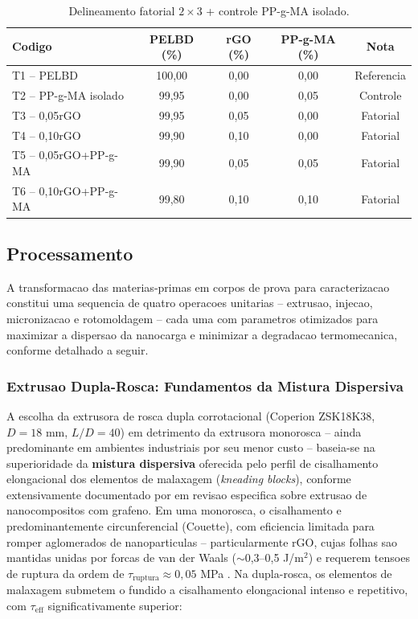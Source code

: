 \documentclass[11pt,a4paper,oneside]{article}
\begin{document}
\begin{table}[H]\centering
\caption{Delineamento fatorial $2{\times}3$ + controle PP-g-MA isolado.}\label{tab:del}
\begin{tabular}{lcccc}
\toprule
{\bfseries Codigo} & {\bfseries PELBD (\%)} & {\bfseries rGO (\%)} & {\bfseries PP-g-MA (\%)} & {\bfseries Nota} \\
\midrule
T1 -- PELBD           & 100,00 & 0,00 & 0,00 & Referencia \\
T2 -- PP-g-MA isolado & 99,95  & 0,00 & 0,05 & Controle \\
T3 -- 0,05rGO         & 99,95  & 0,05 & 0,00 & Fatorial \\
T4 -- 0,10rGO         & 99,90  & 0,10 & 0,00 & Fatorial \\
T5 -- 0,05rGO+PP-g-MA & 99,90  & 0,05 & 0,05 & Fatorial \\
T6 -- 0,10rGO+PP-g-MA & 99,80  & 0,10 & 0,10 & Fatorial \\
\bottomrule
\end{tabular}
\end{table}

\subsection{Processamento}\label{sec:processamento}

A transformacao das materias-primas em corpos de prova para caracterizacao constitui uma
sequencia de quatro operacoes unitarias -- extrusao, injecao, micronizacao e rotomoldagem --
cada uma com parametros otimizados para maximizar a dispersao da nanocarga e minimizar a
degradacao termomecanica, conforme detalhado a seguir.

\subsubsection{Extrusao Dupla-Rosca: Fundamentos da Mistura Dispersiva}

A escolha da extrusora de rosca dupla corrotacional (Coperion ZSK18K38, $D{=}18$ mm,
$L/D{=}40$) em detrimento da extrusora monorosca -- ainda predominante em ambientes industriais
por seu menor custo -- baseia-se na superioridade da {\bfseries mistura dispersiva} oferecida
pelo perfil de cisalhamento elongacional dos elementos de malaxagem (\textit{kneading blocks}),
conforme extensivamente documentado por \citet{Sanes2020} em revisao especifica sobre extrusao
de nanocompositos com grafeno. Em uma monorosca, o cisalhamento e predominantemente
circunferencial (Couette), com eficiencia limitada para romper aglomerados de nanoparticulas
-- particularmente rGO, cujas folhas sao mantidas unidas por forcas de van der Waals
(${\sim}$0,3--0,5 J/m$^2$) e requerem tensoes de ruptura da ordem de $\tau_{\text{ruptura}}
{\approx}0{,}05$ MPa \cite{Kim2010}. Na dupla-rosca, os elementos de malaxagem submetem o
fundido a cisalhamento elongacional intenso e repetitivo, com $\tau_{\text{eff}}$
significativamente superior:
\end{document}

